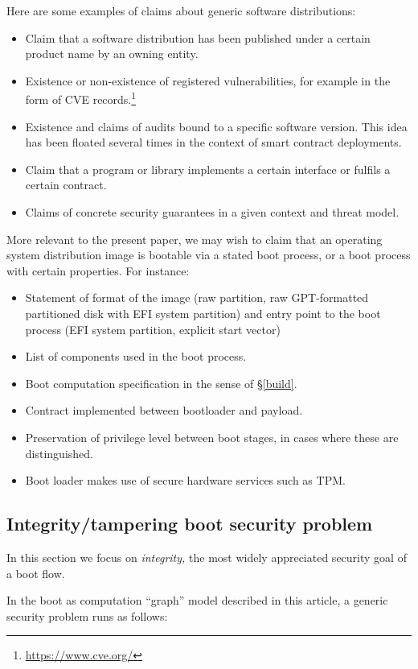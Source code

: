 Here are some examples of claims about generic software distributions:
\begin{itemize}
  \item Claim that a software distribution has been published under a certain product name by an owning entity.
  \item Existence or non-existence of registered vulnerabilities, for example in the form of CVE records.\footnote{\url{https://www.cve.org/}}
  \item Existence and claims of audits bound to a specific software version. This idea has been floated several times in the context of smart contract deployments.
  \item Claim that a program or library implements a certain interface or fulfils a certain contract.
  \item Claims of concrete security guarantees in a given context and threat model.
\end{itemize}
%
More relevant to the present paper, we may wish to claim that an operating system distribution image is bootable via a stated boot process, or a boot process with certain properties.
%
For instance:
\begin{itemize}
  \item Statement of format of the image (raw partition, raw GPT-formatted partitioned disk with EFI system partition) and entry point to the boot process (EFI system partition, explicit start vector)
  \item List of components used in the boot process.
  \item Boot computation specification in the sense of \S\ref{build}.
  \item Contract implemented between bootloader and payload.
  \item Preservation of privilege level between boot stages, in cases where these are distinguished.
  \item Boot loader makes use of secure hardware services such as TPM.
\end{itemize}


\subsection{Integrity/tampering boot security problem}

In this section we focus on \emph{integrity,} the most widely
appreciated security goal of a boot flow.

In the boot as computation ``graph'' model described in this article, a
generic security problem runs as follows:

